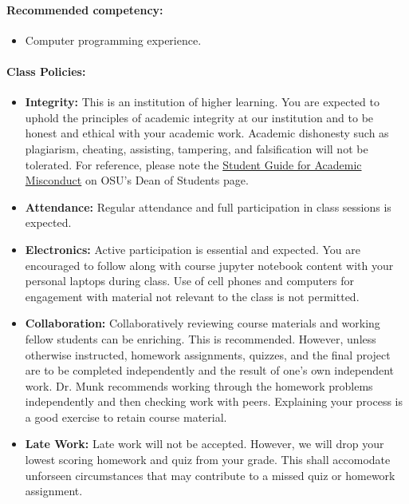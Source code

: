 \documentclass[11pt, a4paper]{article}
\begin{document}
\paragraph{Recommended competency:}
\begin{itemize}
\item Computer programming experience. 
\end{itemize}

\paragraph{Class Policies:}

\begin{itemize}
\item[] \textbf{Integrity:} This is an institution of higher
learning. You are expected to uphold the principles of academic 
integrity at our institution and to be honest and ethical with your academic work. 
Academic dishonesty such as plagiarism, cheating, assisting, tampering, and falsification will not be 
tolerated. 
For reference, please note the \href{https://studentlife.oregonstate.edu/studentconduct/academic-misconduct-students}{Student Guide for Academic Misconduct} 
on OSU's Dean of Students page. 

\item[] \textbf{Attendance:} Regular attendance and full participation in class sessions is expected. 

\item[] \textbf{Electronics:} Active participation is essential and expected. 
  You are encouraged to follow along with course jupyter notebook content with 
  your personal laptops during class. Use of cell phones and computers for 
  engagement with material not relevant to the class is not permitted. 

\item[] \textbf{Collaboration:} Collaboratively reviewing course materials and
  working fellow students can be enriching.  This is
  recommended.  However, unless otherwise instructed, homework assignments, quizzes, and the final project are
  to be completed independently and 
  the result of one's own independent work. Dr. Munk recommends working through
  the homework problems independently and then checking work with peers. Explaining your
  process is a good exercise to retain course material.

\item[] \textbf{Late Work:} Late work will not be accepted. However, we will drop your lowest scoring homework and quiz from your grade. 
This shall accomodate unforseen circumstances that may contribute to a missed quiz or homework assignment.


\end{itemize}
\end{document}
